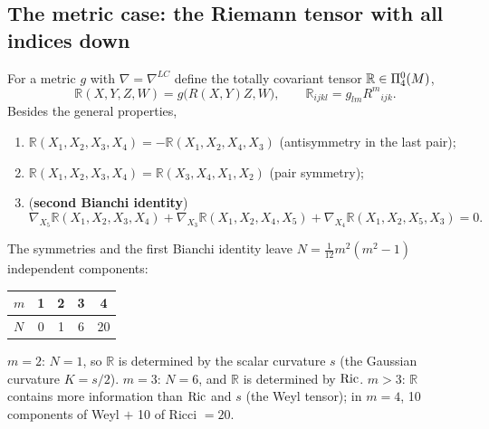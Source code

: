 \subsection{The metric case: the Riemann tensor with all indices down}
\begin{formal}
For a metric $g$ with $\nabla=\nabla^{LC}$ define the totally covariant tensor $\mathbb R\in\Pi^{0}_{4}(M)$,
\[
\mathbb R(X,Y,Z,W)=g\big(R(X,Y)Z,W\big),\qquad \mathbb R_{ijkl}=g_{lm}R^m{}_{ijk}.
\]
Besides the general properties,
\begin{enumerate}[nosep,label=(\alph*)]
\item $\mathbb R(X_1,X_2,X_3,X_4)=-\mathbb R(X_1,X_2,X_4,X_3)$ (antisymmetry in the last pair);
\item $\mathbb R(X_1,X_2,X_3,X_4)=\mathbb R(X_3,X_4,X_1,X_2)$ (pair symmetry);
\item (\textbf{second Bianchi identity}) \[\nabla_{X_5}\mathbb R(X_1,X_2,X_3,X_4)+\nabla_{X_3}\mathbb R(X_1,X_2,X_4,X_5)+\nabla_{X_4}\mathbb R(X_1,X_2,X_5,X_3)=0.\]
\end{enumerate}
\end{formal}

\begin{formal}
The symmetries and the first Bianchi identity leave $N=\frac1{12}m^2(m^2-1)$ independent components:
\begin{center}
\begin{tabular}{@{}lcccc@{}}
\toprule
$m$ & 1 & 2 & 3 & 4\\ \midrule
$N$ & 0 & 1 & 6 & 20\\ \bottomrule
\end{tabular}
\end{center}
$m=2$: $N=1$, so $\mathbb R$ is determined by the scalar curvature $s$ (the Gaussian curvature $K=s/2$). $m=3$: $N=6$, and $\mathbb R$ is determined by $\operatorname{Ric}$. $m>3$: $\mathbb R$ contains more information than $\operatorname{Ric}$ and $s$ (the Weyl tensor); in $m=4$, 10 components of Weyl $+$ 10 of Ricci $=20$.
\end{formal}

